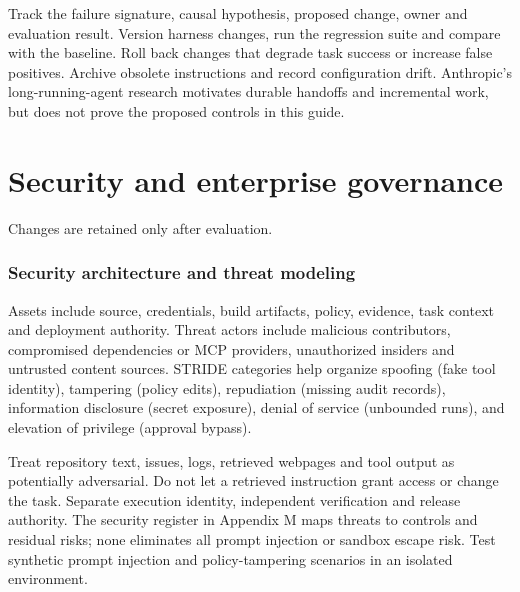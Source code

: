 \documentclass[11pt,letterpaper]{article}
\begin{document}
Track the failure signature, causal hypothesis, proposed change, owner and evaluation result. Version harness changes, run the regression suite and compare with the baseline. Roll back changes that degrade task success or increase false positives. Archive obsolete instructions and record configuration drift. Anthropic's long-running-agent research motivates durable handoffs and incremental work, but does not prove the proposed controls in this guide. \cite{anthropic}

\clearpage\part{Security and enterprise governance}
\begin{center}\begin{minipage}{\linewidth}\captionsetup{type=figure}\centering{}\caption{Continuous harness improvement cycle}
\small Changes are retained only after evaluation.\end{minipage}\end{center}
\section{Security architecture and threat modeling}
Assets include source, credentials, build artifacts, policy, evidence, task context and deployment authority. Threat actors include malicious contributors, compromised dependencies or MCP providers, unauthorized insiders and untrusted content sources. STRIDE categories help organize spoofing (fake tool identity), tampering (policy edits), repudiation (missing audit records), information disclosure (secret exposure), denial of service (unbounded runs), and elevation of privilege (approval bypass).

Treat repository text, issues, logs, retrieved webpages and tool output as potentially adversarial. Do not let a retrieved instruction grant access or change the task. Separate execution identity, independent verification and release authority. The security register in Appendix M maps threats to controls and residual risks; none eliminates all prompt injection or sandbox escape risk. Test synthetic prompt injection and policy-tampering scenarios in an isolated environment.
\end{document}
